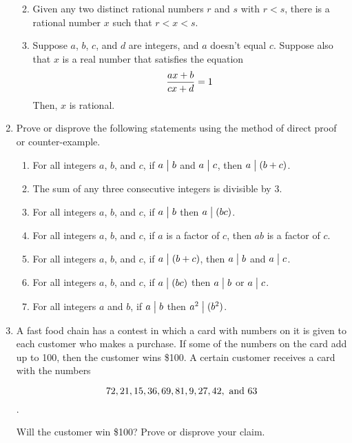 \documentclass{article}
\begin{document}
\begin{enumerate}
\begin{enumerate}
\smallskip

\item Given any two distinct rational numbers $r$ and $s$ with $r<s$, there is a
rational number $x$ such that $r<x<s$.

\smallskip

\item Suppose $a$, $b$, $c$, and $d$ are integers, and $a$ doesn't equal $c$. Suppose
also that $x$ is a real number that satisfies the equation
$${ax+b\over cx+d}=1$$
Then, $x$ is rational.

\end{enumerate}
\item Prove or disprove the following statements using the method of direct proof 
or counter-example.

\begin{enumerate}
\item For all integers $a$, $b$, and $c$, if $a\bigm|b$ and $a\bigm|c$, then
$a\bigm|(b+c)$.

\smallskip

\item The sum of any three consecutive integers is divisible by 3.

\smallskip

\item For all integers $a$, $b$, and $c$, if $a\bigm|b$ then $a\bigm|(bc)$.

\smallskip

\item For all integers $a$, $b$, and $c$, if $a$ is a factor of $c$, then $ab$ is a
factor of $c$.

\smallskip

\item For all integers $a$, $b$, and $c$, if $a\bigm|(b+c)$, then $a\bigm|b$ and
$a\bigm|c$.

\smallskip

\item For all integers $a$, $b$, and $c$, if $a\bigm|(bc)$ then $a\bigm|b$ or
$a\bigm|c$.

\smallskip

\item For all integers $a$ and $b$, if $a\bigm|b$ then $a^2\bigm|(b^2)$.

\smallskip


\end{enumerate}

\item A fast food chain has a contest in which a card with numbers on it is 
given to each customer who makes a purchase. If some of the numbers on the card add
up to 100, then the customer wins \$100. A certain customer receives a card with the
numbers

$$72, 21, 15, 36, 69, 81, 9, 27, 42,\ {\rm and}\ 63$$.

Will the customer win \$100? Prove or disprove your claim.


\end{enumerate}
\end{document}
